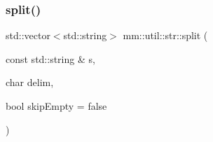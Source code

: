 \subsubsection{\texorpdfstring{split()}{split()}\hspace{0.1cm}{\footnotesize\ttfamily [2/2]}}
{\footnotesize\ttfamily std\+::vector$<$std\+::string$>$ mm\+::util\+::str\+::split (\begin{DoxyParamCaption}\item[{const std\+::string \&}]{s,  }\item[{char}]{delim,  }\item[{bool}]{skip\+Empty = {\ttfamily false} }\end{DoxyParamCaption})\hspace{0.3cm}{\ttfamily [inline]}}

